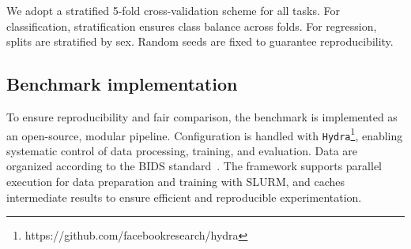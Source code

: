 We adopt a stratified 5-fold cross-validation scheme for all tasks.
For classification, stratification ensures class balance across folds. For regression, splits are stratified by sex. 
Random seeds are fixed to guarantee reproducibility. 



\subsection{Benchmark implementation}
To ensure reproducibility and fair comparison, the benchmark is implemented as an open-source, modular pipeline.
Configuration is handled with \texttt{Hydra}\footnote{https://github.com/facebookresearch/hydra}, enabling systematic control of data processing, training, and evaluation.
Data are organized according to the BIDS standard~\cite{gorgolewski2016brain}.
The framework supports parallel execution for data preparation and training with SLURM, and caches intermediate results to ensure efficient and reproducible experimentation.
